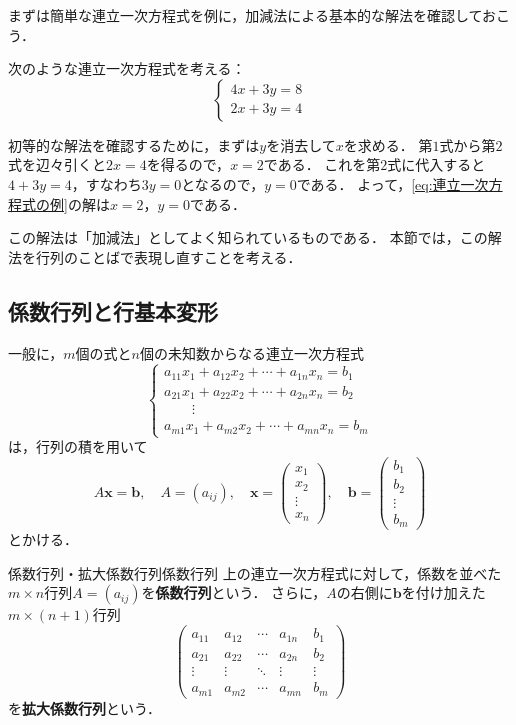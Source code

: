 まずは簡単な連立一次方程式を例に，加減法による基本的な解法を確認しておこう．

次のような連立一次方程式を考える：
\begin{equation}
  \begin{cases}
    4x + 3y = 8 \\
    2x + 3y = 4
  \end{cases} \label{eq:連立一次方程式の例}
\end{equation}

初等的な解法を確認するために，まずは$y$を消去して$x$を求める．
第$1$式から第$2$式を辺々引くと$2x = 4$を得るので，$x = 2$である．
これを第$2$式に代入すると$4 + 3y = 4$，すなわち$3y = 0$となるので，$y = 0$である．
よって，\eqref{eq:連立一次方程式の例}の解は$x = 2$，$y = 0$である．

この解法は「加減法」としてよく知られているものである．
本節では，この解法を行列のことばで表現し直すことを考える．

\subsection{係数行列と行基本変形}

一般に，$m$個の式と$n$個の未知数からなる連立一次方程式
\[
  \begin{cases}
    a_{11}x_1 + a_{12}x_2 + \cdots + a_{1n}x_n = b_1 \\
    a_{21}x_1 + a_{22}x_2 + \cdots + a_{2n}x_n = b_2 \\
    \hspace{2em} \vdots \\
    a_{m1}x_1 + a_{m2}x_2 + \cdots + a_{mn}x_n = b_m
  \end{cases}
\]
は，行列の積を用いて
\[
  A\bm{x} = \bm{b}, \quad
  A = (a_{ij}), \quad
  \bm{x} = \begin{pmatrix} x_1 \\ x_2 \\ \vdots \\ x_n \end{pmatrix}, \quad
  \bm{b} = \begin{pmatrix} b_1 \\ b_2 \\ \vdots \\ b_m \end{pmatrix}
\]
とかける．

\begin{definition}{係数行列・拡大係数行列}{係数行列}
  上の連立一次方程式に対して，係数を並べた$m \times n$行列$A = (a_{ij})$を\textbf{係数行列}という．
  さらに，$A$の右側に$\bm{b}$を付け加えた$m \times (n + 1)$行列
  \[
    \begin{pmatrix}
      a_{11} & a_{12} & \cdots & a_{1n} & b_1 \\
      a_{21} & a_{22} & \cdots & a_{2n} & b_2 \\
      \vdots & \vdots & \ddots & \vdots & \vdots \\
      a_{m1} & a_{m2} & \cdots & a_{mn} & b_m
    \end{pmatrix}
  \]
  を\textbf{拡大係数行列}という．
\end{definition}


